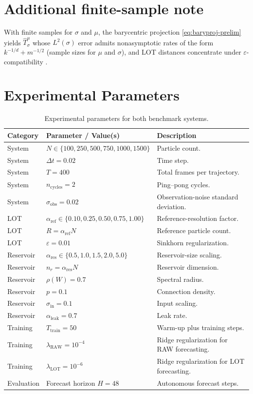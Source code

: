 \documentclass[11pt]{article}
\newcommand{\1}{\mathbf{1}}
\begin{document}
\section{Additional finite-sample note}
With finite samples for \(\sigma\) and \(\mu\), the barycentric projection \eqref{eq:baryproj-prelim} yields \(\widehat T_\sigma^\mu\) whose \(L^2(\sigma)\) error admits nonasymptotic rates of the form \(k^{-1/d}+m^{-1/2}\) (sample sizes for \(\mu\) and \(\sigma\)), and LOT distances concentrate under \(\varepsilon\)-compatibility \cite{deb2021rates,pooladian2021,cloninger2023lotwassmap}.

\section{Experimental Parameters}
\label{table}

\begin{table}[t]
\centering
\caption{Experimental parameters for both benchmark systems.}
\label{tab:params}
\renewcommand{\arraystretch}{1.15}
\begin{tabular}{llp{}}
\toprule
\textbf{Category} & \textbf{Parameter / Value(s)} & \textbf{Description} \\
\midrule
System & $N \in \{100,250,500,750,1000,1500\}$ & Particle count. \\
System & $\Delta t = 0.02$ & Time step. \\
System & $T = 400$ & Total frames per trajectory. \\
System & $n_{\mathrm{cycles}} = 2$ & Ping--pong cycles. \\
System & $\sigma_{\mathrm{obs}} = 0.02$ & Observation-noise standard deviation. \\
\midrule
LOT & $\alpha_{\mathrm{ref}} \in \{0.10,0.25,0.50,0.75,1.00\}$ & Reference-resolution factor. \\
LOT & $R=\alpha_{\mathrm{ref}}N$ & Reference particle count. \\
LOT & $\varepsilon = 0.01$ & Sinkhorn regularization. \\
\midrule
Reservoir & $\alpha_{\mathrm{res}} \in \{0.5,1.0,1.5,2.0,5.0\}$ & Reservoir-size scaling. \\
Reservoir & $n_r=\alpha_{\mathrm{res}}N$ & Reservoir dimension. \\
Reservoir & $\rho(W)=0.7$ & Spectral radius. \\
Reservoir & $p=0.1$ & Connection density. \\
Reservoir & $\sigma_{\mathrm{in}}=0.1$ & Input scaling. \\
Reservoir & $\alpha_{\mathrm{leak}}=0.7$ & Leak rate. \\
\midrule
Training & $T_{\mathrm{train}}=50$ & Warm-up plus training steps. \\
Training & $\lambda_{\mathrm{RAW}}=10^{-4}$ & Ridge regularization for RAW forecasting. \\
Training & $\lambda_{\mathrm{LOT}}=10^{-6}$ & Ridge regularization for LOT forecasting. \\
\midrule
Evaluation & Forecast horizon $H=48$ & Autonomous forecast steps. \\
\bottomrule
\end{tabular}
\end{table}
\end{document}
